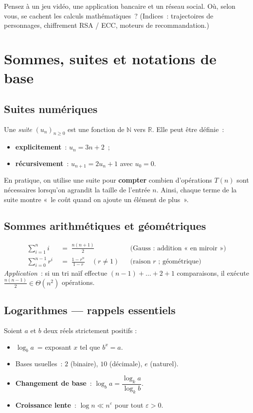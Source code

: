 \begin{reflexion}
Pensez à un jeu vidéo, une application bancaire et un réseau social. Où, selon
vous, se cachent les calculs mathématiques ? (Indices : trajectoires de
personnages, chiffrement RSA / ECC, moteurs de recommandation.)
\end{reflexion}

\section{Sommes, suites et notations de base}

\subsection{Suites numériques}
Une \emph{suite} $(u_n)_{n\ge 0}$ est une fonction de $\mathbb N$ vers
$\mathbb R$. Elle peut être définie :
\begin{itemize}
  \item \textbf{explicitement} : $u_n = 3n+2$ ;
  \item \textbf{récursivement} : $u_{n+1}=2u_n+1$ avec $u_0=0$.
\end{itemize}
En pratique, on utilise une suite pour \textbf{compter} combien d’opérations $T(n)$ sont nécessaires lorsqu’on agrandit la taille de l’entrée $n$. Ainsi, chaque terme de la suite montre « le coût quand on ajoute un élément de plus ».


\subsection{Sommes arithmétiques et géométriques}
\begin{align*}
\sum_{i=1}^{n} i &\;=\; \frac{n(n+1)}{2} && \text{(Gauss : addition « en miroir »)}\\[0.4em]
\sum_{i=0}^{n-1} r^{i} &\;=\; \frac{1-r^{n}}{1-r}\quad (r\neq 1) && \text{(raison $r$ ; géométrique)}
\end{align*}
\emph{Application} : si un tri naïf effectue $(n-1)+\dots+2+1$ comparaisons,
il exécute $\tfrac{n(n-1)}{2}\in\Theta(n^2)$ opérations.

\subsection{Logarithmes — rappels essentiels}
Soient $a$ et $b$ deux réels strictement positifs :\\
\begin{itemize}
  \item $\log_b a$ = exposant $x$ tel que $b^x=a$.
  \item Bases usuelles : $2$ (binaire), $10$ (décimale), $e$ (naturel).
  \item \textbf{Changement de base} : $\log_b a = \dfrac{\log_k a}{\log_k b}$.
  \item \textbf{Croissance lente} : $\log n\ll n^{\varepsilon}$ pour tout
        $\varepsilon>0$.
\end{itemize}

